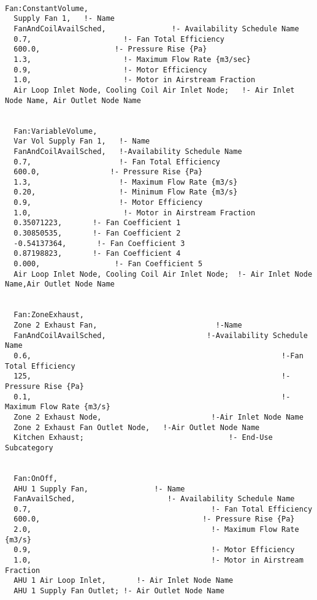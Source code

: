 \begin{lstlisting}

Fan:ConstantVolume,
  Supply Fan 1,   !- Name
  FanAndCoilAvailSched,               !- Availability Schedule Name
  0.7,                     !- Fan Total Efficiency
  600.0,                 !- Pressure Rise {Pa}
  1.3,                     !- Maximum Flow Rate {m3/sec}
  0.9,                     !- Motor Efficiency
  1.0,                     !- Motor in Airstream Fraction
  Air Loop Inlet Node, Cooling Coil Air Inlet Node;   !- Air Inlet Node Name, Air Outlet Node Name


  Fan:VariableVolume,
  Var Vol Supply Fan 1,   !- Name
  FanAndCoilAvailSched,   !-Availability Schedule Name
  0.7,                    !- Fan Total Efficiency
  600.0,                !- Pressure Rise {Pa}
  1.3,                    !- Maximum Flow Rate {m3/s}
  0.20,                   !- Minimum Flow Rate {m3/s}
  0.9,                    !- Motor Efficiency
  1.0,                     !- Motor in Airstream Fraction
  0.35071223,       !- Fan Coefficient 1
  0.30850535,       !- Fan Coefficient 2
  -0.54137364,       !- Fan Coefficient 3
  0.87198823,       !- Fan Coefficient 4
  0.000,                 !- Fan Coefficient 5
  Air Loop Inlet Node, Cooling Coil Air Inlet Node;  !- Air Inlet Node Name,Air Outlet Node Name


  Fan:ZoneExhaust,
  Zone 2 Exhaust Fan,                           !-Name
  FanAndCoilAvailSched,                       !-Availability Schedule Name
  0.6,                                                         !-Fan Total Efficiency
  125,                                                         !-Pressure Rise {Pa}
  0.1,                                                         !-Maximum Flow Rate {m3/s}
  Zone 2 Exhaust Node,                         !-Air Inlet Node Name
  Zone 2 Exhaust Fan Outlet Node,   !-Air Outlet Node Name
  Kitchen Exhaust;                                 !- End-Use Subcategory


  Fan:OnOff,
  AHU 1 Supply Fan,               !- Name
  FanAvailSched,                     !- Availability Schedule Name
  0.7,                                         !- Fan Total Efficiency
  600.0,                                     !- Pressure Rise {Pa}
  2.0,                                         !- Maximum Flow Rate {m3/s}
  0.9,                                         !- Motor Efficiency
  1.0,                                         !- Motor in Airstream Fraction
  AHU 1 Air Loop Inlet,       !- Air Inlet Node Name
  AHU 1 Supply Fan Outlet; !- Air Outlet Node Name
\end{lstlisting}


